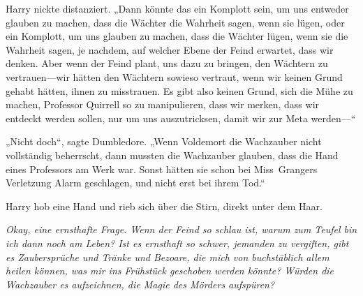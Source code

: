 Harry nickte distanziert.
„Dann könnte das ein Komplott sein, um uns entweder glauben zu machen, dass die Wächter die Wahrheit sagen, wenn sie lügen, oder ein Komplott, um uns glauben zu machen, dass die Wächter lügen, wenn sie die Wahrheit sagen, je nachdem, auf welcher Ebene der Feind erwartet, dass wir denken. Aber wenn der Feind plant, uns dazu zu bringen, den Wächtern zu vertrauen—wir hätten den Wächtern sowieso vertraut, wenn wir keinen Grund gehabt hätten, ihnen zu misstrauen. Es gibt also keinen Grund, sich die Mühe zu machen, Professor Quirrell so zu manipulieren, dass wir merken, dass wir entdeckt werden sollen, nur um uns auszutricksen, damit wir zur Meta werden—“

„Nicht doch“, sagte Dumbledore. „Wenn Voldemort die Wachzauber nicht vollständig beherrscht, dann mussten die Wachzauber glauben, dass die Hand eines Professors am Werk war. Sonst hätten sie schon bei Miss~Grangers Verletzung Alarm geschlagen, und nicht erst bei ihrem Tod.“

Harry hob eine Hand und rieb sich über die Stirn, direkt unter dem Haar.

\emph{Okay, eine ernsthafte Frage. Wenn der Feind so schlau ist, warum zum Teufel bin ich dann noch am Leben? Ist es ernsthaft so schwer, jemanden zu vergiften, gibt es Zaubersprüche und Tränke und Bezoare, die mich von buchstäblich allem heilen können, was mir ins Frühstück geschoben werden könnte? Würden die Wachzauber es aufzeichnen, die Magie des Mörders aufspüren?}

